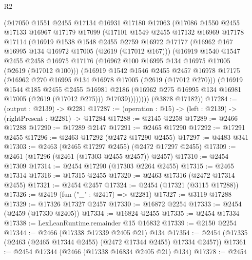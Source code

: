 \begin{lexlean}{R2}
\begin{coremodule}
        (@17050
          @1551
          @2455
          @17134
          @16931
          @17180
          @17063
          (@17086
            @1550
            @2455
            @17133
            @16967
            @17179
            @17099
            (@17101
              @1549
              @2455
              @17132
              @16969
              @17178
              @17114
              (@16919
                @1538
                @1548
                @2455
                @2759
                @16972
                @17177
                (@16962 @167 @16995 @134 @16972 @17005 (@2619 (@17012 @167)))
                (@16919
                  @1540
                  @1547
                  @2455
                  @2458
                  @16975
                  @17176
                  (@16962 @100 @16995 @134 @16975 @17005 (@2619 (@17012 @100)))
                  (@16919
                    @1542
                    @1546
                    @2455
                    @2457
                    @16978
                    @17175
                    (@16962 @270 @16995 @134 @16978 @17005 (@2619 (@17012 @270)))
                    (@16919
                      @1544
                      @185
                      @2455
                      @2455
                      @16981
                      @2186
                      (@16962 @275 @16995 @134 @16981 @17005 (@2619 (@17012 @275)))
                      @17039))))))))
      (@3878 @17182))
@17284 := (output : @2139) -> @2281
@17287 := (operation : @15) -> (left : @2139) -> (rightPresent : @2281) -> @17284
@17288 := @2145 @2258
@17289 := @2466 @17288
@17290 := @17289 @2147
@17291 := @2465 @17290
@17292 := @17291 @2455
@17296 := @2463 @17292 (@2472 @17290 @2455)
@17297 := @4483 @341
@17303 := @2463 (@2465 @17297 @2455) (@2472 @17297 @2455)
@17309 := @2461 (@17296 (@2461 (@17303 @2455 @2457)) @2457)
@17310 := @2454 @17309
@17314 := @2454 @17290 (@17303 @2264 @2455)
@17315 := @2465 @17314
@17316 := @17315 @2455
@17320 := @2463 @17316 (@2472 @17314 @2455)
@17321 := @2454 @2457
@17324 := @2454 (@17321 (@3115 @17288))
@17326 := @2419 (fun ("_" : @2417) => @2281)
@17327 := @3119 @17288
@17329 := @17326 @17327 @2457
@17330 := @16872 @2254
@17333 := @2454 (@2459 (@17330 @2405))
@17334 := @16824 @2455
@17335 := @2454 @17334
@17338 := LexLeanRuntime.remainder @15 @16832
@17339 := @2150 @2254
@17344 := @2466 (@17338 @17339 @2405 @21) @134
@17354 := @2454 (@17335 (@2463 (@2465 @17344 @2455) (@2472 @17344 @2455) @17334 @2457))
@17361 := @2454 @17344 (@2466 (@17338 @16834 @2405 @21) @134)
@17378 := @2454

\end{coremodule}
\end{lexlean}
